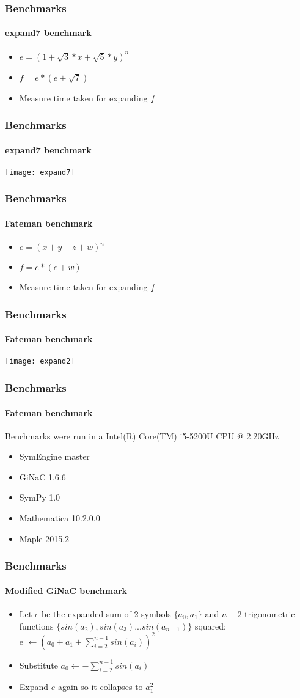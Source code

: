 \documentclass{beamer}
\begin{document}
\begin{frame}
\frametitle{Benchmarks}
\framesubtitle{expand7 benchmark}
\begin{itemize}
\item $ e = (1+\sqrt{3}*x+ \sqrt{5}*y)^n $
\item $ f = e*(e+\sqrt{7}) $
\item Measure time taken for expanding $f$
\end{itemize}
\end{frame}



\begin{frame}
\frametitle{Benchmarks}
\framesubtitle{expand7 benchmark}
\texttt{[image: expand7]}
\end{frame}



\begin{frame}
\frametitle{Benchmarks}
\framesubtitle{Fateman benchmark}
\begin{itemize}
\item $ e = (x + y + z + w) ^ n $
\item $ f = e * (e + w) $
\item Measure time taken for expanding $f$
\end{itemize}
\end{frame}


\begin{frame}
\frametitle{Benchmarks}
\framesubtitle{Fateman benchmark}
\texttt{[image: expand2]}
\end{frame}



\begin{frame}
\frametitle{Benchmarks}
\framesubtitle{Fateman benchmark}
Benchmarks were run in a Intel(R) Core(TM) i5-5200U CPU @ 2.20GHz
\begin{itemize}
 \item SymEngine master
 \item GiNaC 1.6.6
 \item SymPy 1.0
 \item Mathematica 10.2.0.0
 \item Maple 2015.2
\end{itemize}
\end{frame}



\begin{frame}
\frametitle{Benchmarks}
\framesubtitle{Modified GiNaC benchmark}
\begin{itemize}
\item Let $e$ be the expanded sum of 2 symbols $\{a_0, a_1\}$ and $n-2$ trigonometric functions $\{sin(a_2), sin(a_3)...sin(a_{n-1})\}$ squared:\\
e $\leftarrow (a_0+a_1+\sum_{i=2}^{n-1} sin(a_i))^2$
\item Substitute $a_0 \leftarrow -\sum_{i=2}^{n-1} sin(a_i)$
\item Expand $e$ again so it collapses to $a_1^2$
\end{itemize}
\end{frame}
\end{document}
